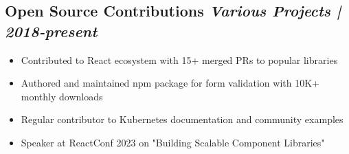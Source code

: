 \documentclass[a4paper,10pt]{article}           %
\begin{document}
    \subsection*{Open Source Contributions \hfill \textit{Various Projects | 2018-present}}
    \vspace{-0.5em}
    \begin{itemize}[leftmargin=0.2cm, itemsep=0pt, label=--]
        \item Contributed to React ecosystem with 15+ merged PRs to popular libraries
        \item Authored and maintained npm package for form validation with 10K+ monthly downloads
        \item Regular contributor to Kubernetes documentation and community examples
        \item Speaker at ReactConf 2023 on "Building Scalable Component Libraries"
    \end{itemize}
\end{document}

